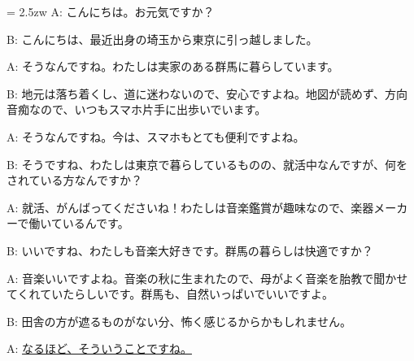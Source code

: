 \documentclass[11pt]{amsart}
\title{}
\author{}
\newenvironment{hangall}[1]{\hangindent = 2.5zw\everypar{\hangindent = 2.5zw}}{}
\begin{document}
\maketitle
\begin{hangall}{}%
A: こんにちは。お元気ですか？

B: こんにちは、最近出身の埼玉から東京に引っ越しました。

A: そうなんですね。わたしは実家のある群馬に暮らしています。

B: 地元は落ち着くし、道に迷わないので、安心ですよね。地図が読めず、方向音痴なので、いつもスマホ片手に出歩いでいます。

A: そうなんですね。今は、スマホもとても便利ですよね。

B: そうですね、わたしは東京で暮らしているものの、就活中なんですが、何をされている方なんですか？

A: 就活、がんばってくださいね！わたしは音楽鑑賞が趣味なので、楽器メーカーで働いているんです。

B: いいですね、わたしも音楽大好きです。群馬の暮らしは快適ですか？

A: 音楽いいですよね。音楽の秋に生まれたので、母がよく音楽を胎教で聞かせてくれていたらしいです。群馬も、自然いっぱいでいいですよ。

B: 田舎の方が遮るものがない分、怖く感じるからかもしれません。

A: \ul{なるほど、そういうことですね。}\end{hangall}
\end{document}
